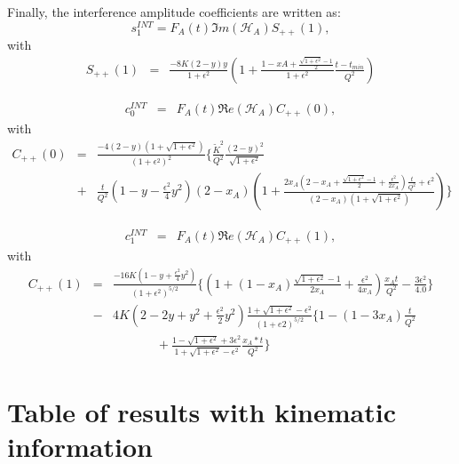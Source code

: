 \documentclass[aps,prc,preprint,superscriptaddress]{revtex4}
\begin{document}
Finally, the interference amplitude coefficients are written as:
\begin{equation}
s_{1}^{INT} = F_{A}(t) \Im m(\mathcal{H}_{A}) S_{++}(1),
\end{equation}
with
\begin{eqnarray}
   S_{++}(1) &=& \frac{-8K(2-y)y}{1+\epsilon^2} \left( 1 + 
\frac{1-xA+\frac{\sqrt{1+\epsilon^2}-1}{2}}{1+\epsilon^2} 
\frac{t-t_{min}}{Q^{2}} \right) \label{eq:s1I}
\end{eqnarray}

\begin{eqnarray}
c_0^{INT} &=& F_A(t) \Re e(\mathcal{H}_{A}) C_{++}(0),
\end{eqnarray}
with \begin{eqnarray}  C_{++}(0) &=&
\frac{-4(2-y)(1+\sqrt{1+\epsilon^{2}})}{(1+\epsilon^{2})^2}  \bigg\{ 
   \frac{\widetilde{K}^2}{Q^2}  \frac{(2-y)^2}{\sqrt{1+\epsilon^{2}}} \, \\
   &+& \frac{t}{Q^2}  \left( 1 - y - \frac{\epsilon^2}{4} y^2 \right)  
(2-x_{A}) \left(  1 + \frac{2x_A(2-x_A + \frac{\sqrt{1+\epsilon^{2}}-1}{2} + 
\frac{\epsilon^{2}}{2x_A})\frac{t}{Q^2} + \epsilon^{2}}{(2-x_A) 
(1+\sqrt{1+\epsilon^{2}})}  \right)  \bigg\} \nonumber
 \label{eq:c0I} 
 \end{eqnarray}

\begin{eqnarray}
   c_1^{INT} &=&  F_A(t) \Re e(\mathcal{H}_{A}) C_{++}(1),
\end{eqnarray}
with  
   \begin{eqnarray}
   C_{++}(1) &=&
   \frac{-16K(1-y+\frac{\epsilon^{2}}{4}y^2)}{(1+\epsilon^{2})^{5/2}}\bigg\{\left(1+(1-x_A)\frac{\sqrt{1+\epsilon^{2}}-1}{2x_A} 
   + \frac{\epsilon^{2}}{4x_A}\right) 
\frac{x_At}{Q^2}-\frac{3\epsilon^{2}}{4.0} \bigg\} \nonumber \\&-& 4K \left( 
2-2y+y^2+\frac{\epsilon^{2}}{2}y^2\right)\frac{1+\sqrt{1+\epsilon^{2}}-\epsilon^{2}}{(1+e2)^{5/2}}\bigg\{1-(1-3x_A)\frac{t}{Q^2}\nonumber\\&\,\,\,\,&\,\,\,\,\,\,\,\,\,\,\,\,\,\,\,\,\,\,\,\,\,+\frac{1-\sqrt{1+\epsilon^{2}}+3\epsilon^{2}}{1+\sqrt{1+\epsilon^{2}}-\epsilon^{2}} 
\frac{x_A*t}{Q^2}\bigg\} \label{eq:c1I}
\end{eqnarray}


\section{Table of results with kinematic information}
\label{sec:fullresults}
\end{document}
